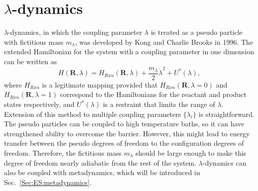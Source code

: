 \section{\texorpdfstring{$\lambda$-dynamics}{λ-dynamics}\label{Sec:ES:lambdadynamics}}
$\lambda$-dynamics, in which the coupling parameter $\lambda$ is treated as a pseudo particle with fictitious mass $m_\lambda$, was developed by Kong and Charlie Brooks in 1996.\cite{KongJCP1996}
The extended Hamiltonian for the system with a coupling parameter in one dimension can be written as
\begin{equation}
	H(\mathbf{R},\lambda)=H_{Rxn}(\mathbf{R},\lambda) + \frac{m_\lambda}{2}{\dot{\lambda}}^2+U^{*}(\lambda),
\end{equation}
where $H_{Rxn}$ is a legitimate mapping provided that $H_{Rxn}(\mathbf{R},\lambda=0)$ and $H_{Rxn}(\mathbf{R},\lambda=1)$ correspond to the Hamiltonians for the reactant and product states respectively, and $U^{*}(\lambda)$ is a restraint that limits the range of $\lambda$. Extension of this method to multiple coupling parameters $\{\lambda_i\}$ is straightforward. The pseudo particles can be coupled to high temperature baths, so it can have strengthened ability to overcome the barrier. However, this might lead to energy transfer between the pseudo degrees of freedom to the configuration degrees of freedom. Therefore, the fictitious mass $m_\lambda$ should be large enough to make this degree of freedom nearly adiabatic from the rest of the system.\cite{AbramsJCP2006} $\lambda$-dynamics can also be coupled with metadynamics,\cite{WuJPCL2011} which will be introduced in Sec.~\ref{Sec:ES:metadynamics}.